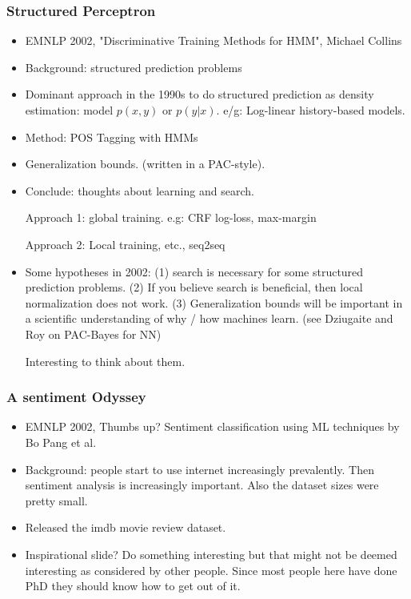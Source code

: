 \subsubsection{Structured Perceptron}
\begin{itemize}
	\item EMNLP 2002, "Discriminative Training Methods for HMM", Michael Collins
	\item Background: structured prediction problems
	\item Dominant approach in the 1990s to do structured prediction as density estimation: model $p(x, y)$ or $p(y|x)$. e/g: Log-linear history-based models.
	\item Method: POS Tagging with HMMs
	\item Generalization bounds. (written in a PAC-style).
	\item Conclude: thoughts about learning and search.
	
	Approach 1: global training. e.g: CRF log-loss, max-margin
	
	Approach 2: Local training, etc., seq2seq
	
	\item Some hypotheses in 2002: (1) search is necessary for some structured prediction problems. (2) If you believe search is beneficial, then local normalization does not work. (3) Generalization bounds will be important in a scientific understanding of why / how machines learn. (see Dziugaite and Roy on PAC-Bayes for NN)
	
	Interesting to think about them.
\end{itemize}

\subsubsection{A sentiment Odyssey}
\begin{itemize}
	\item EMNLP 2002, Thumbs up? Sentiment classification using ML techniques by Bo Pang et al.
	\item Background: people start to use internet increasingly prevalently. Then sentiment analysis is increasingly important. Also the dataset sizes were pretty small.
	\item Released the imdb movie review dataset.
	\item Inspirational slide? Do something interesting but that might not be deemed interesting as considered by other people. Since most people here have done PhD they should know how to get out of it. 
\end{itemize}


